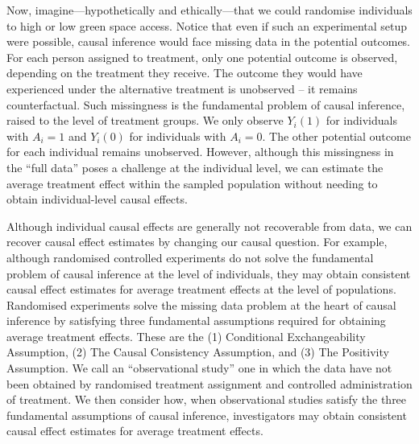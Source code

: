 \documentclass[
  singlecolumn]{article}
\begin{document}
Now, imagine---hypothetically and ethically---that we could randomise
individuals to high or low green space access. Notice that even if such
an experimental setup were possible, causal inference would face missing
data in the potential outcomes. For each person assigned to treatment,
only one potential outcome is observed, depending on the treatment they
receive. The outcome they would have experienced under the alternative
treatment is unobserved -- it remains counterfactual. Such missingness
is the fundamental problem of causal inference, raised to the level of
treatment groups. We only observe \(Y_i(1)\) for individuals with
\(A_i = 1\) and \(Y_i(0)\) for individuals with \(A_i = 0\). The other
potential outcome for each individual remains unobserved. However,
although this missingness in the ``full data'' poses a challenge at the
individual level, we can estimate the average treatment effect within
the sampled population without needing to obtain individual-level causal
effects.

Although individual causal effects are generally not recoverable from
data, we can recover causal effect estimates by changing our causal
question. For example, although randomised controlled experiments do not
solve the fundamental problem of causal inference at the level of
individuals, they may obtain consistent causal effect estimates for
average treatment effects at the level of populations. Randomised
experiments solve the missing data problem at the heart of causal
inference by satisfying three fundamental assumptions required for
obtaining average treatment effects. These are the (1) Conditional
Exchangeability Assumption, (2) The Causal Consistency Assumption, and
(3) The Positivity Assumption. We call an ``observational study'' one in
which the data have not been obtained by randomised treatment assignment
and controlled administration of treatment. We then consider how, when
observational studies satisfy the three fundamental assumptions of
causal inference, investigators may obtain consistent causal effect
estimates for average treatment effects.
\end{document}
